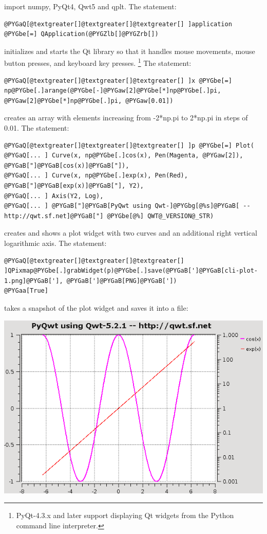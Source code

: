 \documentclass[a4paper,10pt,english]{manual}
\begin{document}
import numpy, PyQt4, Qwt5 and qplt.
The statement:

\begin{Verbatim}[commandchars=@\[\]]
@PYGaQ[@textgreater[]@textgreater[]@textgreater[] ]application @PYGbe[=] QApplication(@PYGZlb[]@PYGZrb[])
\end{Verbatim}

initializes and starts the Qt library so that it handles mouse
movements, mouse button presses, and keyboard key presses. \footnote{
PyQt-4.3.x and later support displaying Qt widgets from the
Python command line interpreter.
}
The statement:

\begin{Verbatim}[commandchars=@\[\]]
@PYGaQ[@textgreater[]@textgreater[]@textgreater[] ]x @PYGbe[=] np@PYGbe[.]arange(@PYGbe[-]@PYGaw[2]@PYGbe[*]np@PYGbe[.]pi, @PYGaw[2]@PYGbe[*]np@PYGbe[.]pi, @PYGaw[0.01])
\end{Verbatim}

creates an array with elements increasing from -2*np.pi to 2*np.pi in
steps of 0.01.
The statement:

\begin{Verbatim}[commandchars=@\[\]]
@PYGaQ[@textgreater[]@textgreater[]@textgreater[] ]p @PYGbe[=] Plot(
@PYGaQ[... ] Curve(x, np@PYGbe[.]cos(x), Pen(Magenta, @PYGaw[2]), @PYGaB["]@PYGaB[cos(x)]@PYGaB["]),
@PYGaQ[... ] Curve(x, np@PYGbe[.]exp(x), Pen(Red), @PYGaB["]@PYGaB[exp(x)]@PYGaB["], Y2),
@PYGaQ[... ] Axis(Y2, Log),
@PYGaQ[... ] @PYGaB["]@PYGaB[PyQwt using Qwt-]@PYGbg[@%s]@PYGaB[ -- http://qwt.sf.net]@PYGaB["] @PYGbe[@%] QWT@_VERSION@_STR)
\end{Verbatim}

creates and shows a plot widget with two curves and an additional
right vertical logarithmic axis.
The statement:

\begin{Verbatim}[commandchars=@\[\]]
@PYGaQ[@textgreater[]@textgreater[]@textgreater[] ]QPixmap@PYGbe[.]grabWidget(p)@PYGbe[.]save(@PYGaB[']@PYGaB[cli-plot-1.png]@PYGaB['], @PYGaB[']@PYGaB[PNG]@PYGaB['])
@PYGaa[True]
\end{Verbatim}

takes a snapshot of the plot widget and saves it into a file:

\includegraphics{cli-plot-1.png}
\end{document}
